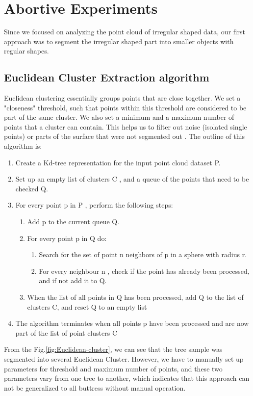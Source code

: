 \documentclass[runningheads,a4paper]{llncs}
\begin{document}
\section{Abortive Experiments}
Since we focused on analyzing the point cloud of irregular shaped data, our first approach was to segment the irregular shaped part into smaller objects with regular shapes. 
\subsection{Euclidean Cluster Extraction algorithm}
Euclidean clustering essentially groups points that are close together. We set a "closeness" threshold, such that points within this threshold are considered to be part of the same cluster. We also set a minimum and a maximum number of points that a cluster can contain. This helps us to filter out noise (isolated single points) or parts of the surface that were not segmented out \cite{9}. The outline of this algorithm is:
\begin{enumerate}
\item Create a Kd-tree representation for the input point cloud dataset P.
\item Set up an empty list of clusters C , and a queue of the points that need to be checked Q.
\item For every point p in P , perform the following steps:
\begin{enumerate}
\item Add p to the current queue Q.
\item	For every point p in Q do:
\begin{enumerate}
\item Search for the set of point n neighbors of p in a sphere with radius r.
\item For every neighbour n , check if the point has already been processed, and if not add it to Q.
\end{enumerate}
\item When the list of all points in Q has been processed, add Q to the list of clusters C, and reset Q to an empty list
\end{enumerate}
\item The algorithm terminates when all points p have been processed and are now part of the list of point clusters C
\end{enumerate}

From the Fig.\ref{fig:Euclidean-cluster}, we can see that the tree sample was segmented into several Euclidean Cluster. However, we have to manually set up parameters for threshold and maximum number of points, and these two parameters vary from one tree to another, which indicates that this approach can not be generalized to all buttress without manual operation. 
\end{document}
